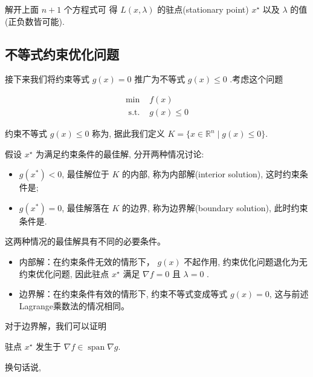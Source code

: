 解开上面 $ n+1 $ 个方程式可 得 $ L({x}, \lambda) $ 的驻点(stationary point) $ {x}^{\star} $ 以及 $ \lambda $ 的值(正负数皆可能).

\subsection{不等式约束优化问题}

接下来我们将约束等式 $ g({x})=0 $ 推广为不等式 $ g({x}) \leq 0 $ .考虑这个问题

\begin{problem}[不等式约束优化问题]

$$
\begin{array}{ll}
\min & f({x}) \\
\text { s.t. } & g({x}) \leq 0
\end{array}
$$

约束不等式 $ g({x}) \leq 0 $ 称为, 据此我们定义 $ K=\{ {x} \in \mathbb{R}^{n} \mid g({x}) \leq 0 \}$.
\end{problem}

假设 $ {x}^{\star} $ 为满足约束条件的最佳解, 分开两种情况讨论:

\begin{itemize}
    \item $ g\left({x}^{*}\right)<0 $, 最佳解位于 $ K $ 的内部, 称为内部解(interior solution), 这时约束条件是;
    \item $ g\left({x}^{*}\right)=0 $, 最佳解落在 $ K $ 的边界, 称为边界解(boundary solution), 此时约束条件是.
\end{itemize}

这两种情况的最佳解具有不同的必要条件。

\begin{itemize}
    \item 内部解：在约束条件无效的情形下， $ g({x}) $ 不起作用, 约束优化问题退化为无约束优化问题, 因此驻点 $ {x}^{\star} $ 满足 $ \nabla f={0} $ 且 $ \lambda=0 $ .
    \item 边界解：在约束条件有效的情形下, 约束不等式变成等式 $g({x})=0$, 这与前述Lagrange乘数法的情况相同。
\end{itemize}

对于边界解，我们可以证明

\begin{theorem}
    驻点 ${x}^{\star}$ 发生于 $\nabla f \in \operatorname{span} \nabla g$.
\end{theorem}
换句话说, 

